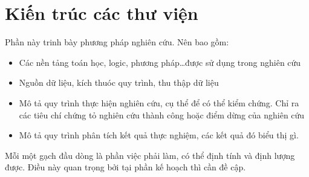 \section{Kiến trúc các thư viện}
\label{sec:architecture}

Phần này trinh bày phương pháp nghiên cứu. Nên bao gồm: 

\begin{itemize}
    \item Các nền tảng toán học, logic, phương pháp\dots được sử dụng trong nghiên cứu
    \item Nguồn dữ liệu, kích thuóc quy trình, thu thập dữ liệu
    \item Mô tả quy trình thực hiện nghiên cứu, cụ thể để có thể kiểm chứng. Chỉ ra các tiêu chí chứng tỏ nghiên cứu thành công hoặc điểm dừng của nghiên cứu
    \item Mô tả quy trình phân tích kết quả thực nghiệm, các kết quả đó biểu thị gì.
\end{itemize}

Mỗi một gạch đầu dòng là phần việc phải làm, có thể định tính và định lượng được. Điều này quan trọng bởi tại phần kế hoạch thì cần đề cập.